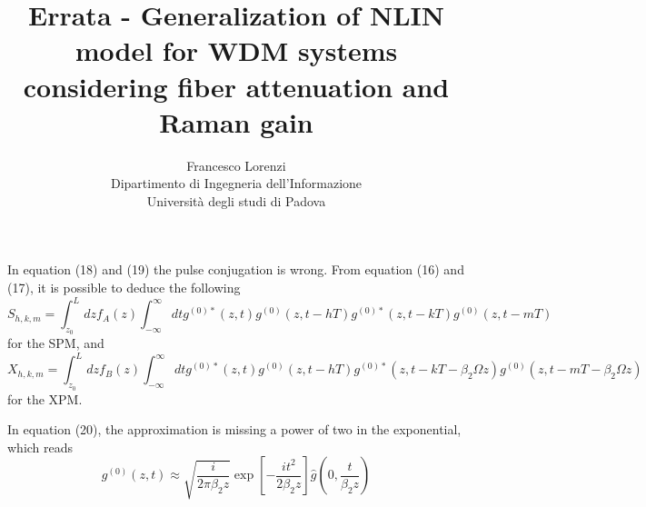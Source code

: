 \documentclass[10pt, lettersize, journal, onecolumn]{IEEEtran}
\title{Errata - Generalization of NLIN model for WDM systems considering fiber attenuation and Raman gain}
\author{Francesco Lorenzi  \vspace{2pt}\\  {\footnotesize Dipartimento di Ingegneria dell'Informazione\\ \vspace{-5pt} Università degli studi di Padova}}
\begin{document}
	\maketitle
	In equation (18) and (19) the pulse conjugation is wrong. From equation (16) and (17), it is possible to deduce the following 
	\begin{equation}
		S_{h, k, m} = \int_{z_0}^{L} dz f_A(z) \int_{-\infty}^{\infty} dt g^{(0)*}(z, t) g^{(0)}(z, t-hT) g^{(0)*}(z, t-kT)g^{(0)}(z, t-mT)
	\end{equation}
	for the SPM, and
	\begin{equation}\label{eq:hkm}
		X_{h, k, m} = \int_{z_0}^{L} dz f_B(z) \int_{-\infty}^{\infty} dt g^{(0)*}(z, t) g^{(0)}(z, t-hT) g^{(0)*}(z, t-kT -\beta_2 \Omega z)g^{(0)}(z, t-mT-\beta_2 \Omega z)
	\end{equation}
	for the XPM.
	
	\vspace{30pt}
	In equation (20), the approximation is missing a power of two in the exponential, which reads
	\begin{equation}\label{eq:papoulis}
		g^{(0)}(z, t) \approx \sqrt{\frac{i}{2\pi \beta_2 z}} \exp\left[-\frac{it^2}{2 \beta_2 z}\right] \hat{g}\left(0, \frac{t}{\beta_2 z}\right)	
	\end{equation}
\end{document}
